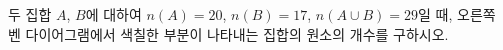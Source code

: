 \noindent\begin{minipage}[t]{0.58\linewidth}\vspace{0pt}\raggedright 두 집합 $A$, $B$에 대하여 $n(A)=20$, $n(B)=17$, $n(A\cup B)=29$일 때, 오른쪽 벤 다이어그램에서 색칠한 부분이 나타내는 집합의 원소의 개수를 구하시오.\end{minipage}\hfill\begin{minipage}[t]{0.4\linewidth}\vspace{0pt}\centering \resizebox{\ifdim\width>\linewidth\linewidth\else\width\fi}{!}{}\end{minipage}\par
